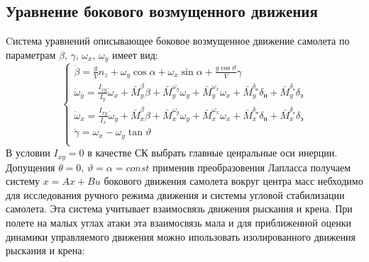 \documentclass{article}
\begin{document}
\subsection{Уравнение бокового возмущенного движения}
Cистема уравнений описывающее боковое возмущенное движение самолета по параметрам $\beta, \, \gamma, \, \omega_x, \, \omega_y$ имеет вид:
\begin{equation}
	\begin{cases}
		\dot{\beta} = \frac{g}{V} n_z + \omega_y \cos{\alpha} + \omega_x \sin{\alpha} + \frac{g\cos{\vartheta}}{V} \gamma                                                                                              \\
        \dot{\omega}_y = \frac{I_{xy}}{I_y} \dot{\omega}_x + \bar{M}_y^\beta \beta + \bar{M}_y^{\omega_y} \omega_y + \bar{M}_y^{\omega_x} \omega_x + \bar{M}_y^{\delta_\text{н}} \delta_\text{н} + \bar{M}_y^{\delta_\text{э}} \delta_\text{э} \\
        \dot{\omega}_x = \frac{I_{xy}}{I_x} \dot{\omega}_y + \bar{M}_x^\beta \beta + \bar{M}_x^{\omega_y} \omega_y + \bar{M}_x^{\omega_x} \omega_x + \bar{M}_x^{\delta_\text{н}} \delta_\text{н} + \bar{M}_x^{\delta_\text{э}} \delta_\text{э} \\
		\dot{\gamma} = \omega_x - \omega_y \tan{\vartheta}                                                                                                                                                            \\ 
	\end{cases}
\end{equation}
В условии $I_{xy} = 0$ в качестве СК выбрать главные ценральные оси инерции.\\
Допущения $\theta = 0, \, \vartheta = \alpha = const$ применив преобразовения Лапласса получаем 
систему $x = Ax + Bu$ бокового движения самолета вокруг центра масс небходимо для исследования ручного режима движения и системы угловой стабилизации самолета. Эта система учитывает взаимосвязь движения рыскания и крена. При полете на малых углах атаки эта взаимосвязь мала и для приближенной оценки динамики управляемого движения можно ипользовать изолированного движения рыскания и крена:\\
\end{document}
